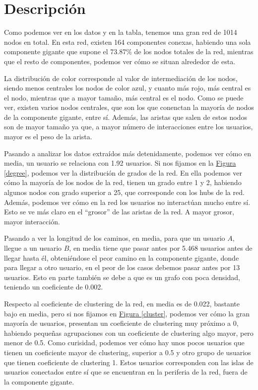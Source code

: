 \documentclass[paper=a4, fontsize=11pt]{article} %
\numberwithin{equation}{section} %
\numberwithin{figure}{section} %
\numberwithin{table}{section} %
\begin{document}
\section{Descripción}

Como podemos ver en los datos y en la tabla, tenemos una gran red de 1014 nodos en total. En esta red, existen 164 componentes conexas, habiendo una sola componente gigante que supone el 73.87\% de los nodos totales de la red, mientras que el resto de componentes, podemos ver cómo se situan alrededor de esta. 

La distribución de color corresponde al valor de intermediación de los nodos, siendo menos centrales los nodos de color azul, y cuanto más rojo, más central es el nodo, mientras que a mayor tamaño, más central es el nodo. Como se puede ver, existen varios nodos centrales, que son los que conenctan la mayoría de nodos de la componente gigante, entre sí. Además, las aristas que salen de estos nodos son de mayor tamaño ya que, a mayor número de interacciones entre los usuarios, mayor es el peso de la arista. 

Pasando a analizar los datos extraídos más detenidamente, podemos ver cómo en media, un usuario se relaciona con 1.92 usuarios. Si nos fijamos en la \hyperref[degree]{Figura \ref*{degree}}, podemos ver la distribución de grados de la red. En ella podemos ver cómo la mayoría de los nodos de la red, tienen un grado entre 1 y 2, habiendo algunos nodos con grado superior a 25, que corresponde con los hubs de la red. Además, podemos ver cómo en la red los usuarios no interactúan mucho entre sí. Esto se ve más claro en el ``grosor'' de las aristas de la red. A mayor grosor, mayor interacción.

Pasando a ver la longitud de los caminos, en media, para que un usuario $A$, llegue a un usuario $B$, en media tiene que pasar antes por 5.468 usuarios antes de llegar hasta él, obteniéndose el peor camino en la componente gigante, donde para llegar a otro usuario, en el peor de los casos debemos pasar antes por 13 usuarios. Esto en parte también se debe a que es un grafo con poca densidad, teniendo un coeficiente de 0.002. 

Respecto al coeficiente de clustering de la red, en media es de 0.022, bastante bajo en media, pero si nos fijamos en \hyperref[cluster]{Figura \ref*{cluster}}, podemos ver cómo la gran mayoría de usuarios, presentan un coeficiente de clustering muy próximo a 0, habiendo pequeñas agrupaciones con un coeficiente de clustering algo mayor, pero menor de 0.5. Como curisidad, podemos ver cómo hay unos pocos usuarios que tienen un coeficiente mayor de clustering, superior a 0.5 y otro grupo de usuarios que tienen coeficiente de clustering 1. Estos usuarios corresponden con las islas de usuarios conectados entre sí que se encuentran en la periferia de la red, fuera de la componente gigante.
\end{document}
